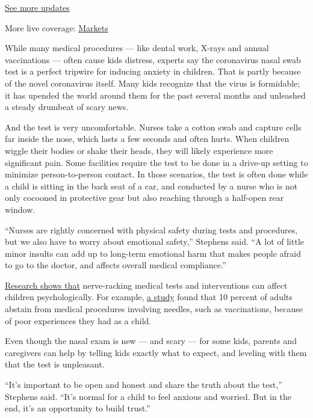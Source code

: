 \href{https://www.nytimes.com/2020/08/01/world/coronavirus-covid-19.html?action=click\&pgtype=Article\&state=default\&region=MAIN_CONTENT_1\&context=storylines_live_updates}{See
more updates}

More live coverage:
\href{https://www.nytimes.com/live/2020/07/31/business/stock-market-today-coronavirus?action=click\&pgtype=Article\&state=default\&region=MAIN_CONTENT_1\&context=storylines_live_updates}{Markets}

While many medical procedures --- like dental work, X-rays and annual
vaccinations --- often cause kids distress, experts say the coronavirus
nasal swab test is a perfect tripwire for inducing anxiety in children.
That is partly because of the novel coronavirus itself. Many kids
recognize that the virus is formidable; it has upended the world around
them for the past several months and unleashed a steady drumbeat of
scary news.

And the test is very uncomfortable. Nurses take a cotton swab and
capture cells far inside the nose, which lasts a few seconds and often
hurts. When children wiggle their bodies or shake their heads, they will
likely experience more significant pain. Some facilities require the
test to be done in a drive-up setting to minimize person-to-person
contact. In those scenarios, the test is often done while a child is
sitting in the back seat of a car, and conducted by a nurse who is not
only cocooned in protective gear but also reaching through a half-open
rear window.

``Nurses are rightly concerned with physical safety during tests and
procedures, but we also have to worry about emotional safety,'' Stephens
said. ``A lot of little minor insults can add up to long-term emotional
harm that makes people afraid to go to the doctor, and affects overall
medical compliance.''

\href{https://www.wjgnet.com/2219-2808/full/v5/i2/143.htm}{Research
shows that} nerve-racking medical tests and interventions can affect
children psychologically. For example,
\href{https://www.cmaj.ca/content/182/18/E843.short}{a study} found that
10 percent of adults abstain from medical procedures involving needles,
such as vaccinations, because of poor experiences they had as a child.

Even though the nasal exam is new --- and scary --- for some kids,
parents and caregivers can help by telling kids exactly what to expect,
and leveling with them that the test is unpleasant.

``It's important to be open and honest and share the truth about the
test,'' Stephens said. ``It's normal for a child to feel anxious and
worried. But in the end, it's an opportunity to build trust.''

